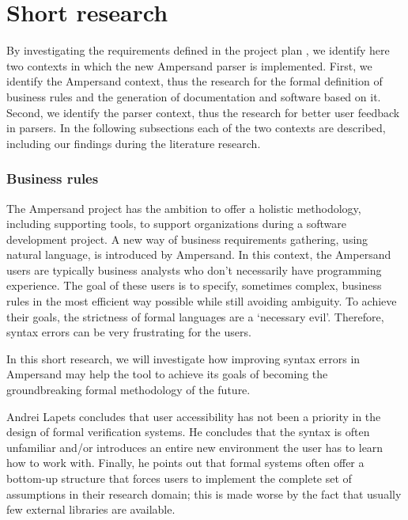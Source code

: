 
\section{Short research}
\label{sec:research}
By investigating the requirements defined in the project plan , we identify here two contexts in which the new Ampersand parser is implemented.
First, we identify the Ampersand context, thus the research for the formal definition of business rules and the generation of documentation and software based  on it.
Second, we identify the parser context, thus the research for better user feedback in parsers.
In the following subsections each of the two contexts are described, including our findings during the literature research.

\subsubsection{Business rules}
The Ampersand project has the ambition to offer a holistic methodology, including supporting tools, to support organizations during a software development project.
A new way of business requirements gathering, using natural language, is introduced by Ampersand.
In this context, the Ampersand users are typically business analysts who don't necessarily have programming experience.
The goal of these users is to specify, sometimes complex, business rules in the most efficient way possible while still avoiding ambiguity. To achieve their goals, the strictness of formal languages are a `necessary evil'. Therefore, syntax errors can be very frustrating for the users.

In this short research, we will investigate how improving syntax errors in Ampersand may help the tool to achieve its goals of becoming the groundbreaking formal methodology of the future.

Andrei Lapets  concludes that user accessibility has not been a priority in the design of formal verification systems.
He concludes that the syntax is often unfamiliar and/or introduces an entire new environment the user has to learn how to work with.
Finally, he points out that formal systems often offer a bottom-up structure that forces users to implement the complete set of assumptions in their research domain; this is made worse by the fact that usually few external libraries are available.

